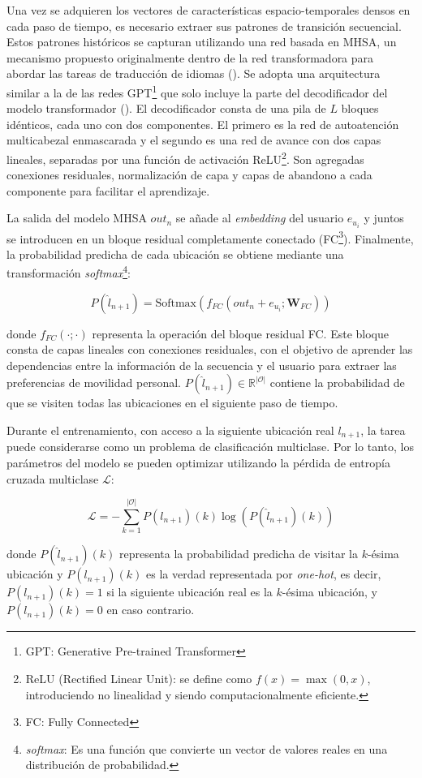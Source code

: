 Una vez se adquieren los vectores de características 
espacio-temporales densos en cada paso de tiempo, es necesario extraer 
sus patrones de transición secuencial. Estos patrones históricos 
se capturan utilizando una red basada en MHSA, un mecanismo 
propuesto originalmente dentro de la red transformadora para 
abordar las tareas de traducción de idiomas (\cite{vaswani2017attention}). 
Se adopta una arquitectura similar a la de las redes GPT\footnote{GPT: Generative Pre-trained Transformer} que solo incluye la parte del decodificador 
del modelo transformador (\cite{radford2018improving}). El decodificador 
consta de una pila de \(L\) bloques idénticos, cada uno con dos 
componentes. El primero es la red de autoatención multicabezal enmascarada 
y el segundo es una red de avance con dos capas lineales, 
separadas por una función de activación ReLU\footnote{ReLU 
(Rectified Linear Unit): se define como 
$f(x) = \max(0, x)$, introduciendo no linealidad y siendo 
computacionalmente eficiente.}. Son agregadas
conexiones residuales, normalización de capa y capas de abandono 
a cada componente para facilitar el aprendizaje. 

La salida del modelo MHSA \(out_n\) se añade al \textit{embedding} del 
usuario \(e_{u_i}\) y juntos se introducen en un bloque residual 
completamente conectado (FC\footnote{FC: Fully Connected}). Finalmente, 
la probabilidad 
predicha de cada ubicación se obtiene mediante una transformación 
\textit{softmax}\footnote{\textit{softmax}: Es una función que convierte 
un vector de valores reales en una distribución de probabilidad.}:

\begin{equation}
P(\hat{l}_{n+1}) = \text{Softmax}(f_{FC}(out_n + e_{u_i}; \mathbf{W}_{FC}))  \tag{3}
\label{ec:3}
\end{equation}

donde \(f_{FC}(\cdot; \cdot)\) representa la operación del 
bloque residual FC. Este bloque consta de capas lineales con 
conexiones residuales, con el objetivo de aprender las dependencias 
entre la información de la secuencia y el usuario para extraer 
las preferencias de movilidad personal. 
\(P(\hat{l}_{n+1}) \in \mathbb{R}^{|\mathcal{O}|}\) contiene la 
probabilidad de que se visiten todas las ubicaciones en el 
siguiente paso de tiempo.

Durante el entrenamiento, con acceso a la siguiente ubicación 
real \(l_{n+1}\), la tarea puede considerarse como un problema de 
clasificación multiclase. Por lo tanto, los parámetros del modelo 
se pueden optimizar utilizando la pérdida de entropía cruzada 
multiclase \(\mathcal{L}\):

\begin{equation}
\mathcal{L} = -\sum_{k=1}^{|\mathcal{O}|} P(l_{n+1})(k) \log(P(\hat{l}_{n+1})(k)) \tag{4}
\label{eq:4}
\end{equation}

donde \(P(\hat{l}_{n+1})(k)\) representa la probabilidad predicha 
de visitar la \(k\)-ésima ubicación y \(P(l_{n+1})(k)\) es la verdad 
representada por \textit{one-hot}, es decir, 
\(P(l_{n+1})(k) = 1\) si la siguiente ubicación real es la 
\(k\)-ésima ubicación, y \(P(l_{n+1})(k) = 0\) en caso contrario.